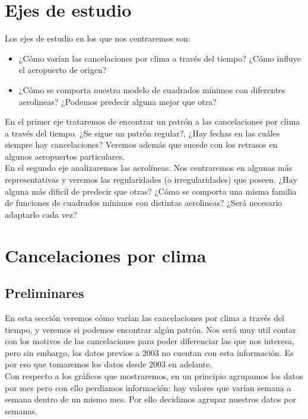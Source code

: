 \section{Ejes de estudio}

Los ejes de estudio en los que nos centraremos son:
\begin{itemize}
    \item ¿Cómo varían las cancelaciones por clima a través del tiempo? ¿Cómo influye el aeropuerto de origen?
    \item ¿Cómo se comporta nuestro modelo de cuadrados mínimos con diferentes aerolineas? ¿Podemos predecir alguna mejor que otra?
\end{itemize}


En el primer eje trataremos de encontrar un patrón a las cancelaciones por clima a través del tiempo. ¿Se sigue un patrón regular?, ¿Hay fechas en las cuáles siempre hay cancelaciones? Veremos además que sucede con los retrasos en algunos aeropuertos particulares. \\

En el segundo eje analizaremos las aerolíneas. Nos centraremos en algunas más representativas y veremos las regularidades (o irregularidades) que poseen. ¿Hay alguna más dificil de predecir que otras? ¿Cómo se comporta una misma familia de funciones de cuadrados mínimos con distintas aerolineas? ¿Será necesario adaptarlo cada vez? \\

\section{Cancelaciones por clima}

\subsection{Preliminares}

En esta sección veremos cómo varían las cancelaciones por clima a través del tiempo, y veremos si podemos encontrar algún patrón. Nos será muy util contar con los motivos de las cancelaciones para poder diferenciar las que nos interesa, pero sin embargo, los datos previos a 2003 no cuentan con esta información. Es por eso que tomaremos los datos desde 2003 en adelante. \\

Con respecto a los gráficos que mostraremos, en un principio agrupamos los datos por mes pero con ello perdíamos información: hay valores que varían semana a semana dentro de un mismo mes. Por ello decidimos agrupar nuestros datos por semanas. \\

